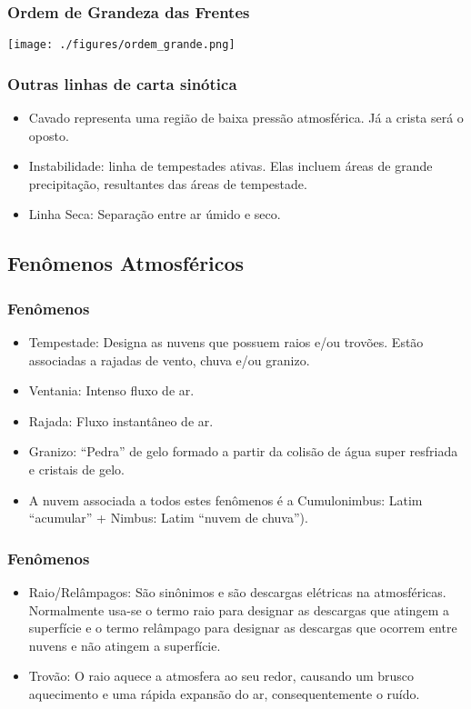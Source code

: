 \begin{frame}
\frametitle{Ordem de Grandeza das Frentes}
  \begin{center}
    \texttt{[image: ./figures/ordem\_grande.png]}
  \end{center}
\end{frame}


\begin{frame}
\frametitle{Outras linhas de carta sinótica}
  \begin{itemize}[<+-| alert@+>]
    \item Cavado representa uma região de baixa pressão atmosférica.  Já a
          crista será o oposto.
    \item Instabilidade: linha de tempestades ativas.  Elas incluem áreas de
          grande precipitação, resultantes das áreas de tempestade.
    \item Linha Seca: Separação entre ar úmido e seco.
  \end{itemize}
\end{frame}


\subsection{Fenômenos Atmosféricos}
\begin{frame}
\frametitle{Fenômenos}
  \begin{itemize}[<+-| alert@+>]
  \item Tempestade: Designa as nuvens que possuem raios e/ou trovões. Estão
        associadas a rajadas de vento, chuva e/ou granizo.
  \item Ventania: Intenso fluxo de ar.
  \item Rajada: Fluxo instantâneo de ar.
  \item Granizo: ``Pedra'' de gelo formado a partir da colisão de água super
        resfriada e cristais de gelo.
  \item A nuvem associada a todos estes fenômenos é a Cumulonimbus: Latim
        ``acumular'' + Nimbus: Latim ``nuvem de chuva'').
\end{itemize}
\end{frame}


\begin{frame}
\frametitle{Fenômenos}
  \begin{itemize}[<+-| alert@+>]
  \item Raio/Relâmpagos: São sinônimos e são descargas elétricas na
        atmosféricas.  Normalmente usa-se o termo raio para designar as
        descargas que atingem a superfície e o termo relâmpago para designar as
        descargas que ocorrem entre nuvens e não atingem a superfície.
  \item Trovão: O raio aquece a atmosfera ao seu redor, causando um brusco
        aquecimento e uma rápida expansão do ar, consequentemente o ruído.
\end{itemize}
\end{frame}


